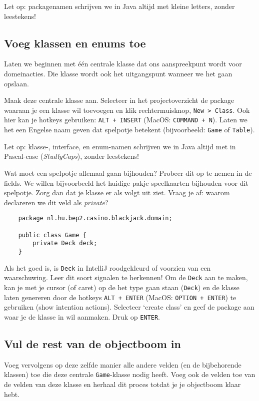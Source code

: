 Let op: packagenamen schrijven we in Java altijd met kleine letters,
zonder leestekens!

\subsection{Voeg klassen en enums toe}
Laten we beginnen met één centrale klasse dat ons aanspreekpunt wordt
voor domeinacties. Die klasse wordt ook het uitgangspunt wanneer we het gaan opslaan.

Maak deze centrale klasse aan. Selecteer in het projectoverzicht de 
package waaraan je een klasse wil toevoegen en klik rechtermuisknop, \texttt{New > Class}. 
Ook hier kan je hotkeys gebruiken: \texttt{ALT + INSERT} (MacOS: \texttt{COMMAND + N}).
Laten we het een Engelse naam geven dat spelpotje betekent (bijvoorbeeld: \texttt{Game} of \texttt{Table}).

Let op: klasse-, interface, en enum-namen schrijven we in Java altijd met in Pascal-case 
(\textit{StudlyCaps}), zonder leestekens!

Wat moet een spelpotje allemaal gaan bijhouden? Probeer dit op te nemen in de fields.
We willen bijvoorbeeld het huidige pakje speelkaarten bijhouden voor dit spelpotje.
Zorg dan dat je klasse er als volgt uit ziet. Vraag je af: waarom declareren we dit veld als \textit{private}?

\begin{verbatim}
    package nl.hu.bep2.casino.blackjack.domain;

    public class Game {
        private Deck deck;
    }
\end{verbatim}

Als het goed is, is \texttt{Deck} in IntelliJ roodgekleurd 
of voorzien van een waarschuwing. Leer dit soort signalen te herkennen!
Om de \texttt{Deck} aan te maken, kan je met je cursor (of caret) op de het
type gaan staan (\texttt{Deck}) en de klasse laten genereren door de hotkeys
\texttt{ALT + ENTER} (MacOS: \texttt{OPTION + ENTER}) te gebruiken 
(show intention actions). Selecteer `create class' en geef de package aan 
waar je de klasse in wil aanmaken. Druk op \texttt{ENTER}.

\subsection{Vul de rest van de objectboom in}
Voeg vervolgens op deze zelfde manier alle andere velden (en de bijbehorende klassen) toe 
die deze centrale \texttt{Game}-klasse nodig heeft.
Voeg ook de velden toe van de velden van deze klasse en herhaal dit proces totdat
je je objectboom klaar hebt.

